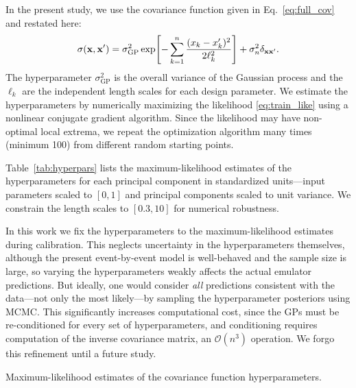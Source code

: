 \documentclass[aps,prc,reprint,superscriptaddress,amsmath]{revtex4-1}
\begin{document}
In the present study, we use the covariance function given in Eq.~\eqref{eq:full_cov} and restated here:
\begin{equation*}
  \sigma(\mathbf x, \mathbf x') = \sigma_\text{GP}^2 \exp\Biggl[ -\sum_{k=1}^n \frac{(x_k - x'_k)^2}{2\ell_k^2} \Biggr] + \sigma_n^2\delta_{\mathbf x\mathbf x'}.
\end{equation*}
The hyperparameter $\sigma^2_\text{GP}$ is the overall variance of the Gaussian process and the $\ell_k$ are the independent length scales for each design parameter.
We estimate the hyperparameters by numerically maximizing the likelihood \eqref{eq:train_like} using a nonlinear conjugate gradient algorithm.
Since the likelihood may have non-optimal local extrema, we repeat the optimization algorithm many times (minimum 100) from different random starting points.

Table~\ref{tab:hyperpars} lists the maximum-likelihood estimates of the hyperparameters for each principal component in standardized units---input parameters scaled to $[0, 1]$ and principal components scaled to unit variance.
We constrain the length scales to $[0.3, 10]$ for numerical robustness.

In this work we fix the hyperparameters to the maximum-likelihood estimates during calibration.
This neglects uncertainty in the hyperparameters themselves, although the present event-by-event model is well-behaved and the sample size is large, so varying the hyperparameters weakly affects the actual emulator predictions.
But ideally, one would consider \emph{all} predictions consistent with the data---not only the most likely---by sampling the hyperparameter posteriors using MCMC.
This significantly increases computational cost, since the GPs must be re-conditioned for every set of hyperparameters, and conditioning requires computation of the inverse covariance matrix, an $\mathcal O(n^3)$ operation.
We forgo this refinement until a future study.

\begin{table}
  \caption{
    \label{tab:hyperpars}
    Maximum-likelihood estimates of the covariance function hyperparameters.
  }
  
\end{table}





\end{document}
